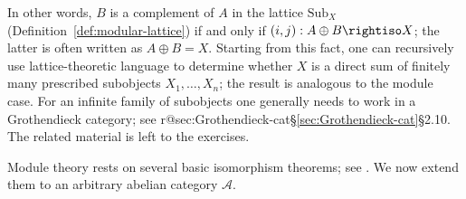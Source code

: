 In other words, $B$ is a complement of $A$ in the lattice $\mathrm{Sub}_X$
(Definition~\ref{def:modular-lattice}) if and only if
$(i,j):A\oplus B\rightiso X$; the latter is often written as
$A\oplus B=X$. Starting from this fact, one can recursively use
lattice-theoretic language to determine whether $X$ is a direct sum of
finitely many prescribed subobjects $X_1,\ldots,X_n$; the result is analogous
to the module case. For an infinite family of subobjects one generally needs
to work in a Grothendieck category; see
\ifcsname r@sec:Grothendieck-cat\endcsname\S\ref{sec:Grothendieck-cat}\else\S2.10\fi.
The related material is left to the exercises.

Module theory rests on several basic isomorphism theorems; see
\cite[Propositions 6.1.11, 6.1.12, 6.1.13]{Li1}. We now extend them to an
arbitrary abelian category $\mathcal{A}$.

